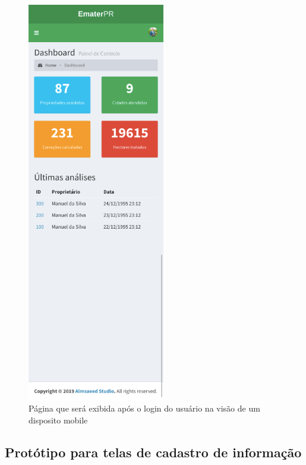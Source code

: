 \begin{figure}[H]
    \centering
    \includegraphics[width=6cm]{./dados/figuras/prototipos/home_mobile.png}
    \caption{Página que será exibida após o login do usuário na visão de um disposito mobile}
    \label{fig:prototipo_home_mobile}
\end{figure}

\subsection{Protótipo para telas de cadastro de informação}
\label{sec:titSecPrototiposCreate}

